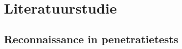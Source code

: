 








\section{Literatuurstudie}%
\label{sec:literatuurstudie}

\subsection{Reconnaissance in penetratietests}

